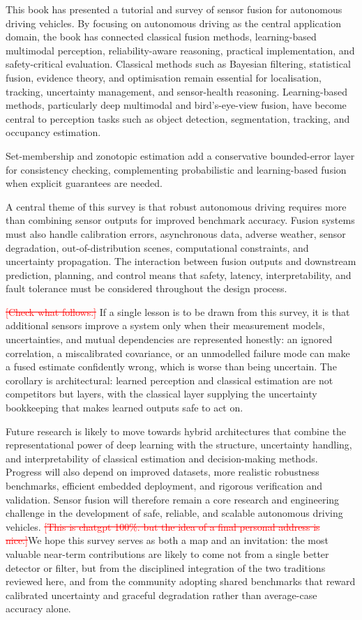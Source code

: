 \documentclass[11pt,oneside,openany]{book}
\newcommand{\added}[1]{\textcolor{RevisionBlue}{#1}}
\newcommand{\deleted}[1]{\textcolor{red}{\sout{#1}}}
\begin{document}
This book has presented a tutorial and survey of sensor fusion for autonomous driving vehicles. By focusing on autonomous driving as the central application domain, the book has connected classical fusion methods, learning-based multimodal perception, reliability-aware reasoning, practical implementation, and safety-critical evaluation. Classical methods such as Bayesian filtering, statistical fusion, evidence theory, and optimisation remain essential for localisation, tracking, uncertainty management, and sensor-health reasoning. Learning-based methods, particularly deep multimodal and bird's-eye-view fusion, have become central to perception tasks such as object detection, segmentation, tracking, and occupancy estimation.

Set-membership and zonotopic estimation add a conservative bounded-error layer for consistency checking, complementing probabilistic and learning-based fusion when explicit guarantees are needed.

A central theme of this survey is that robust autonomous driving requires more than combining sensor outputs for improved benchmark accuracy. Fusion systems must also handle calibration errors, asynchronous data, adverse weather, sensor degradation, out-of-distribution scenes, computational constraints, and uncertainty propagation. The interaction between fusion outputs and downstream prediction, planning, and control means that safety, latency, interpretability, and fault tolerance must be considered throughout the design process.

\deleted{[Check what follows.]} %
\added{If a single lesson is to be drawn from this survey, it is that additional sensors improve a system only when their measurement models, uncertainties, and mutual dependencies are represented honestly: an ignored correlation, a miscalibrated covariance, or an unmodelled failure mode can make a fused estimate confidently wrong, which is worse than being uncertain. The corollary is architectural: learned perception and classical estimation are not competitors but layers, with the classical layer supplying the uncertainty bookkeeping that makes learned outputs safe to act on.}

Future research is likely to move towards hybrid architectures that combine the representational power of deep learning with the structure, uncertainty handling, and interpretability of classical estimation and decision-making methods. Progress will also depend on improved datasets, more realistic robustness benchmarks, efficient embedded deployment, and rigorous verification and validation. Sensor fusion will therefore remain a core research and engineering challenge in the development of safe, reliable, and scalable autonomous driving vehicles. \deleted{[This is chatgpt 100\%. but the idea of a final personal address is nice.]}\added{We hope this survey serves as both a map and an invitation: the most valuable near-term contributions are likely to come not from a single better detector or filter, but from the disciplined integration of the two traditions reviewed here, and from the community adopting shared benchmarks that reward calibrated uncertainty and graceful degradation rather than average-case accuracy alone.}
\end{document}
